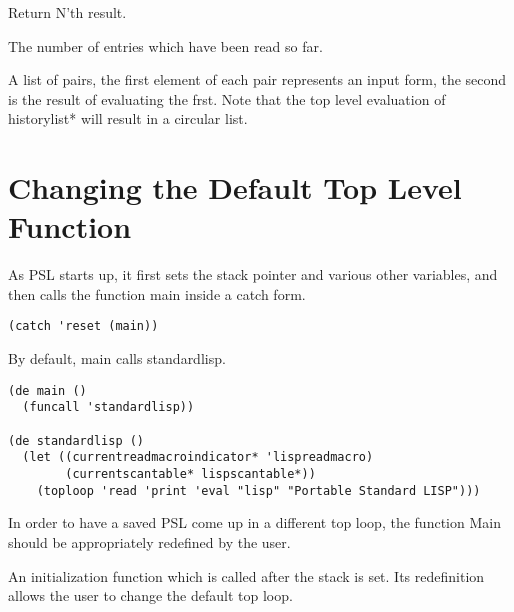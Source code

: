 {    Return N'th result.
}

{
    The number of entries which have been read so far.
}

{
    A list of pairs, the first element of each  pair  represents
    an  input  form,  the second is the result of evaluating the
    frst.  Note that the top level  evaluation  of  historylist*
    will result in a circular list.
}

\section{Changing the Default Top Level Function}

  As  PSL starts up, it first sets the stack pointer and various
other variables, and then calls the function main inside a catch
form.

\begin{verbatim}
(catch 'reset (main))
\end{verbatim}
By default, main calls standardlisp.

\begin{verbatim}
(de main ()
  (funcall 'standardlisp))

(de standardlisp ()
  (let ((currentreadmacroindicator* 'lispreadmacro)
        (currentscantable* lispscantable*))
    (toploop 'read 'print 'eval "lisp" "Portable Standard LISP")))
\end{verbatim}
  In order to have a saved PSL come up in a different top  loop,
the function Main should be appropriately redefined by the user.


{    An  initialization  function which is called after the stack
    is set.  Its redefinition allows  the  user  to  change  the
    default top loop.
}
